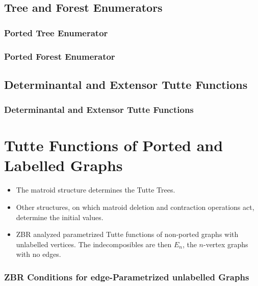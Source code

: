 \documentclass{beamer}
\begin{document}
\subsection{Tree and Forest Enumerators}
\begin{frame}
\frametitle{Ported Tree Enumerator}
\end{frame}

\begin{frame}
\frametitle{Ported Forest Enumerator}
\end{frame}

\subsection{Determinantal and Extensor Tutte Functions}
\begin{frame}
\frametitle{Determinantal and Extensor Tutte Functions}
\end{frame}

\section{Tutte Functions of Ported and Labelled Graphs}
\begin{frame}
\begin{itemize}
\item The matroid structure determines the Tutte Trees.
\item Other structures, on which matroid deletion and
contraction operations act, determine the initial values.
\item ZBR analyzed parametrized Tutte functions of 
non-ported graphs with unlabelled vertices.  The
indecomposibles are then $E_n$, the $n$-vertex graphs
with no edges.  
\end{itemize}
\end{frame}

\begin{frame}
\frametitle{ZBR Conditions for edge-Parametrized unlabelled Graphs}
\end{frame}
\end{document}
